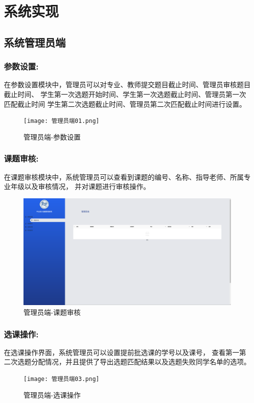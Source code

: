 \section{系统实现}

\subsection{系统管理员端}

\subsubsection{参数设置:}
在参数设置模块中，管理员可以对专业、教师提交题目截止时间、管理员审核题目截止时间、
学生第一次选题开始时间、学生第一次选题截止时间、管理员第一次匹配截止时间
学生第二次选题截止时间、管理员第二次匹配截止时间进行设置。
\begin{figure}[ht] %
    \centering
    \texttt{[image: 管理员端01.png]} %
    \caption{管理员端-参数设置} %
    \label{fig:manager01} %
\end{figure}

\clearpage

\subsubsection{课题审核:}
在课题审核模块中，系统管理员可以查看到课题的编号、名称、指导老师、所属专业年级以及审核情况，
并对课题进行审核操作。
\begin{figure}[h]
    \centering
    \includegraphics[width=1\textwidth]{images/管理员端02.png}
    \caption{管理员端-课题审核}
    \label{fig:manager02}
\end{figure}

\subsubsection{选课操作:}
在选课操作界面，系统管理员可以设置提前批选课的学号以及课号，
查看第一第二次选题分配情况，并且提供了导出选题匹配结果以及选题失败同学名单的选项。
\begin{figure}[h]
    \centering
    \texttt{[image: 管理员端03.png]}
    \caption{管理员端-选课操作}
    \label{fig:manager03}
\end{figure}

